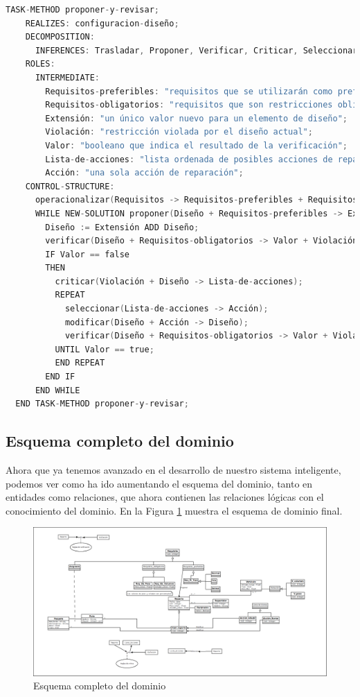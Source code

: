 \begin{lstlisting}[language=C,caption=\textbf{Método de la tarea}]
  TASK-METHOD proponer-y-revisar;
    REALIZES: configuracion-diseño;
    DECOMPOSITION:
      INFERENCES: Trasladar, Proponer, Verificar, Criticar, Seleccionar, Modificar;
    ROLES:
      INTERMEDIATE:
        Requisitos-preferibles: "requisitos que se utilizarán como preferencias (suaves)";
        Requisitos-obligatorios: "requisitos que son restricciones obligatorias (estrictas)";
        Extensión: "un único valor nuevo para un elemento de diseño";
        Violación: "restricción violada por el diseño actual";
        Valor: "booleano que indica el resultado de la verificación";
        Lista-de-acciones: "lista ordenada de posibles acciones de reparación (fijación)";
        Acción: "una sola acción de reparación";
    CONTROL-STRUCTURE:
      operacionalizar(Requisitos -> Requisitos-preferibles + Requisitos-obligatorios);
      WHILE NEW-SOLUTION proponer(Diseño + Requisitos-preferibles -> Extensión) DO
        Diseño := Extensión ADD Diseño;
        verificar(Diseño + Requisitos-obligatorios -> Valor + Violación);
        IF Valor == false
        THEN
          criticar(Violación + Diseño -> Lista-de-acciones);
          REPEAT
            seleccionar(Lista-de-acciones -> Acción);
            modificar(Diseño + Acción -> Diseño);
            verificar(Diseño + Requisitos-obligatorios -> Valor + Violación);
          UNTIL Valor == true;
          END REPEAT
        END IF
      END WHILE
  END TASK-METHOD proponer-y-revisar;
\end{lstlisting}

      
\newpage

\subsection{Esquema completo del dominio}
Ahora que ya tenemos avanzado en el desarrollo de nuestro sistema inteligente, podemos ver como ha ido aumentando el esquema del dominio, tanto en entidades como relaciones, que ahora contienen las relaciones lógicas con el conocimiento del dominio. En la Figura \ref{fig:DominioCompleto} muestra el esquema de dominio final.

\begin{figure}[H]
  \centering
  \includegraphics[scale=0.20, angle=90]{imaxes/Diagrama_Dominio_Completo.png}
  \caption{\label{fig:DominioCompleto}Esquema completo del dominio}
\end{figure}

